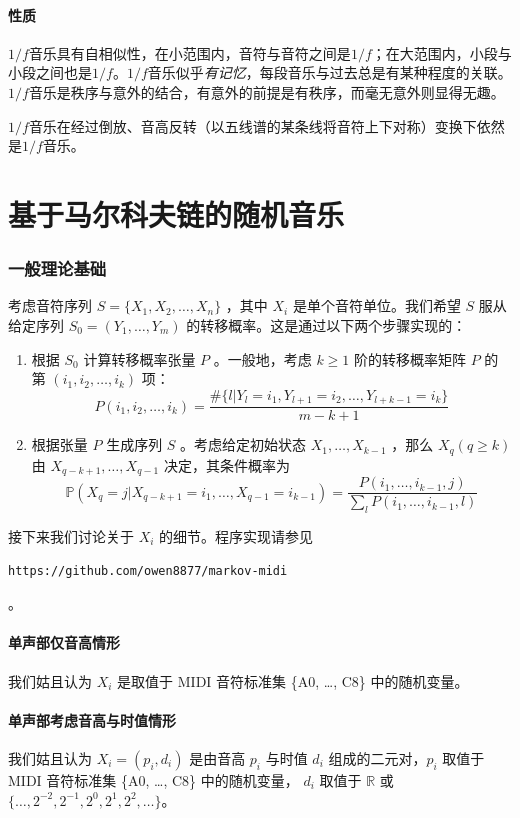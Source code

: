 \documentclass[11pt]{article}
\begin{document}
\subsection{性质}
$1/f$音乐具有自相似性，在小范围内，音符与音符之间是$1/f$；在大范围内，小段与小段之间也是$1/f$。$1/f$音乐似乎\emph{有记忆}，每段音乐与过去总是有某种程度的关联。$1/f$音乐是秩序与意外的结合，有意外的前提是有秩序，而毫无意外则显得无趣。

$1/f$音乐在经过倒放、音高反转（以五线谱的某条线将音符上下对称）变换下依然是$1/f$音乐。


\part{基于马尔科夫链的随机音乐}
\section{一般理论基础}
考虑音符序列 $S=\{X_1, X_2, \dots, X_n\}$ ，其中 $X_i$ 是单个音符单位。我们希望 $S$ 服从给定序列 $S_0 = (Y_1, \dots, Y_m)$ 的转移概率。这是通过以下两个步骤实现的：
\begin{enumerate}
\item 根据 $S_0$ 计算转移概率张量 $P$ 。一般地，考虑 $k \ge 1$ 阶的转移概率矩阵 $P$ 的第 $(i_1, i_2, \dots, i_k)$ 项：
$$
P(i_1, i_2, \dots, i_k) = \frac{\#\{l|Y_l=i_1, Y_{l+1}=i_2, \dots, Y_{l+k-1}=i_k\}}{m-k+1}
$$
\item 根据张量 $P$ 生成序列 $S$ 。考虑给定初始状态 $X_1, \dots, X_{k-1}$ ，那么 $X_q(q \ge k)$ 由 $X_{q-k+1}, \dots, X_{q-1}$ 决定，其条件概率为
$$
\mathbb{P}(X_q=j|X_{q-k+1}=i_1, \dots, X_{q-1}=i_{k-1}) = \frac{P(i_1, \dots, i_{k-1}, j)}{\sum_l P(i_1, \dots, i_{k-1}, l)}
$$
\end{enumerate}
接下来我们讨论关于 $X_i$ 的细节。程序实现请参见 \begin{verbatim}https://github.com/owen8877/markov-midi\end{verbatim} 。
\subsection{单声部仅音高情形}
我们姑且认为 $X_i$ 是取值于 MIDI 音符标准集 \{A0, \dots, C8\} 中的随机变量。
\subsection{单声部考虑音高与时值情形}
我们姑且认为 $X_i=(p_i, d_i)$ 是由音高 $p_i$ 与时值 $d_i$ 组成的二元对，$p_i$ 取值于 MIDI 音符标准集 \{A0, \dots, C8\} 中的随机变量， $d_i$ 取值于 $\mathbb{R}$ 或 $\{\dots, 2^{-2}, 2^{-1}, 2^{0}, 2^{1}, 2^{2}, \dots\}$。
\end{document}
